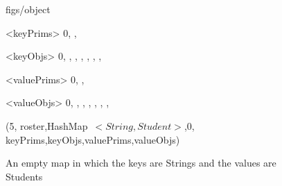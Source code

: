 




\begin {figure}


\Draw

 {figs/object}

\Indirect \Table <keyPrims>
 {  0, ,  }
  
\Indirect \Table <keyObjs>
 {  0, , , , , , ,  }
  
\Indirect \Table <valuePrims>
 {  0, ,   }
  
\Indirect \Table <valueObjs>
 {  0, ,  ,  , , , ,  }

\Obj (5, roster,HashMap~$<String{,}Student>$,0, 
	keyPrims,keyObjs,valuePrims,valueObjs)
    
\EndDraw

\caption {An empty map in which the keys are Strings and the values
are Students}

\label {fig:HashMap0}

\end {figure}


